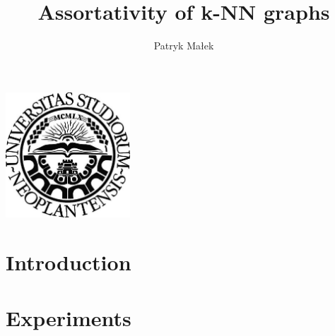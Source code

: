 \documentclass[a4paper,11pt]{article}
\newcommand{\mahtitle}{Assortativity of k-NN graphs}
\begin{document}
\label{Title} 
\title{\vspace{1pc} \mahtitle \vspace{4pc}}
\author{Patryk Małek \vspace{-0.7pc}}
\date{}
\maketitle
\thispagestyle{empty}


\vspace{6pc}
\centerline{
\includegraphics[width=0.35\textwidth,height=0.35\textheight,keepaspectratio]{NoviSadLogoGray.jpg}
}
\vspace{8pc}

\clearpage
\begin{abstract}
\label{Abstract}

\end{abstract}


\clearpage
\tableofcontents


\clearpage
\section{Introduction} 



\clearpage
\section{Experiments}

\end{document}

